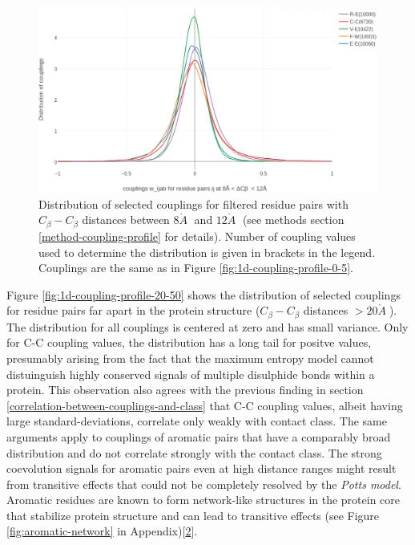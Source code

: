 \documentclass[12pt,a4paper,twoside]{book}
\newcommand{\Cb}{C_\beta}
\newcommand{\angstrom}{\mathring{A} \;}
\theoremstyle{definition}
\theoremstyle{definition}
\theoremstyle{remark}
\begin{document}
\begin{figure}
\includegraphics[width=1\linewidth]{img/coupling_matrix_analysis/1d_coupling_profile_8_12} \caption{Distribution of selected
couplings for filtered residue pairs with \(\Cb-\Cb\) distances between
\(8\angstrom\) and \(12 \angstrom\) (see methods section
\ref{method-coupling-profile} for details). Number of coupling values
used to determine the distribution is given in brackets in the legend.
Couplings are the same as in Figure \ref{fig:1d-coupling-profile-0-5}.}\label{fig:1d-coupling-profile-8-12}
\end{figure}

Figure \ref{fig:1d-coupling-profile-20-50} shows the distribution of
selected couplings for residue pairs far apart in the protein structure
(\(\Cb-\Cb\) distances \(> 20\angstrom\)).\\
The distribution for all couplings is centered at zero and has small
variance. Only for C-C coupling values, the distribution has a long tail
for positve values, presumably arising from the fact that the maximum
entropy model cannot distuinguish highly conserved signals of multiple
disulphide bonds within a protein. This observation also agrees with the
previous finding in section
\ref{correlation-between-couplings-and-class} that C-C coupling values,
albeit having large standard-deviations, correlate only weakly with
contact class. The same arguments apply to couplings of aromatic pairs
that have a comparably broad distribution and do not correlate strongly
with the contact class. The strong coevolution signals for aromatic
pairs even at high distance ranges might result from transitive effects
that could not be completely resolved by the \emph{Potts model}.
Aromatic residues are known to form network-like structures in the
protein core that stabilize protein structure and can lead to transitive
effects (see Figure \ref{fig:aromatic-network} in
Appendix){[}\protect\hyperlink{ref-Burley1985}{2}{]}.
\end{document}
